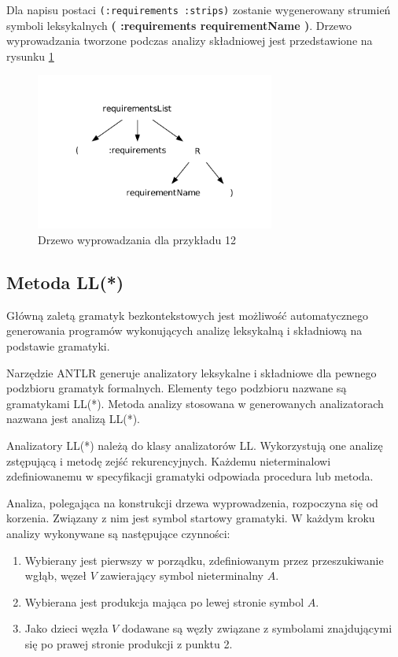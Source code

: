 Dla napisu postaci \texttt{(:requirements :strips)} zostanie
wygenerowany strumień symboli leksykalnych \textbf{( :requirements requirementName )}.
Drzewo wyprowadzania tworzone podczas analizy składniowej jest przedstawione 
na rysunku \ref{antlr_example}

\begin{figure}[h!]
  \centering
    \includegraphics[width=0.7\textwidth]{img/antlr_example.pdf}
    \caption{Drzewo wyprowadzania dla przykładu 12}
    \label{antlr_example}
\end{figure}

\subsection{Metoda LL(*)}
Główną zaletą gramatyk bezkontekstowych jest możliwość automatycznego generowania programów
wykonujących analizę leksykalną i składniową na podstawie gramatyki.

Narzędzie ANTLR generuje analizatory leksykalne i składniowe dla pewnego podzbioru
gramatyk formalnych. Elementy tego podzbioru nazwane są gramatykami LL(*). Metoda 
analizy stosowana w generowanych analizatorach nazwana jest analizą LL(*). 

Analizatory LL(*) należą do klasy analizatorów LL. Wykorzystują one
analizę zstępującą i metodę zejść 
rekurencyjnych. Każdemu nieterminalowi zdefiniowanemu w specyfikacji gramatyki
odpowiada procedura lub metoda. 

Analiza, polegająca na konstrukcji drzewa
wyprowadzenia, rozpoczyna się od korzenia. Związany z nim jest symbol 
startowy gramatyki. W każdym kroku analizy wykonywane są następujące czynności:
\begin{enumerate}
\item Wybierany jest pierwszy w porządku, zdefiniowanym przez
  przeszukiwanie wgłąb, węzeł $V$ zawierający symbol nieterminalny $A$.
\item Wybierana jest produkcja mająca po lewej stronie symbol $A$.
\item Jako dzieci węzła $V$ dodawane są węzły związane z symbolami znajdującymi się po prawej
  stronie produkcji z punktu 2.
\end{enumerate}

